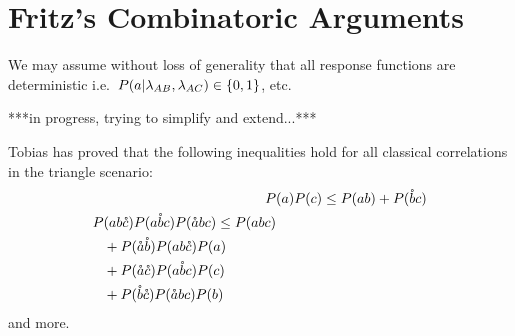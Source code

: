 \section{Fritz's Combinatoric Arguments}
We may assume without loss of generality that all response functions are deterministic i.e.~$P(a|\lambda_{AB},\lambda_{AC})\in\lbrace{0,1\rbrace}$, etc.

***in progress, trying to simplify and extend...***

Tobias has proved that the following inequalities hold for all classical correlations in the triangle scenario:
\begin{align}
P&(a) P(c)  \leq  P(ab) + P(\mathring{b} c)\\
\begin{split}
P&(a b\mathring{c}) P(a \mathring{b} c) P(\mathring{a} b c) \leq P(abc)\\
& + P(\mathring{a} \mathring{b}) P(a b \mathring{c}) P(a)\\& + P(\mathring{a}\mathring{c}) P(a\mathring{b} c) P(c)\\&  + P(\mathring{b} \mathring{c}) P(\mathring{a} b c) P(b)
\end{split}
\end{align}
and more. 




 




